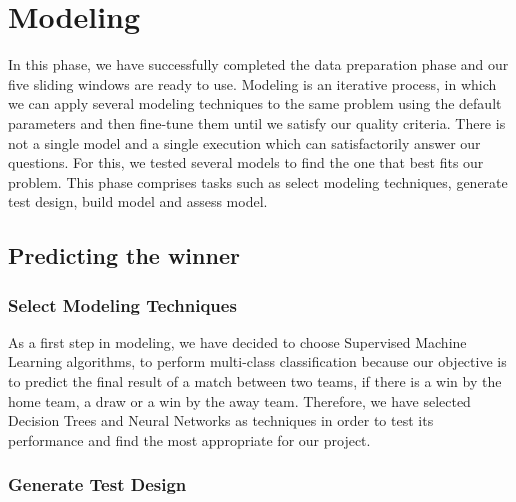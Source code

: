 \chapter{Modeling}
\label{cha:Modelling}

In this phase, we have successfully completed the data preparation phase and our five sliding windows are ready to use. \newline \newline
Modeling is an iterative process, in which we can apply several modeling techniques to the same problem using the default parameters and then fine-tune them until we satisfy our quality criteria. There is not a single model and a single execution which can satisfactorily answer our questions. For this, we tested several models to find the one that best fits our problem.\newline \newline
This phase comprises tasks such as select modeling techniques, generate test design, build model and assess model.

\section{Predicting the winner}
\subsection{Select Modeling Techniques}

As a first step in modeling, we have decided to choose Supervised Machine Learning algorithms, to perform multi-class classification because our objective is to predict the final result of a match between two teams, if there is a win by the home team, a draw or a win by the away team. \newline \newline
Therefore, we have selected Decision Trees and Neural Networks as techniques in order to test its performance and find the most appropriate for our project.

\subsection{Generate Test Design}

